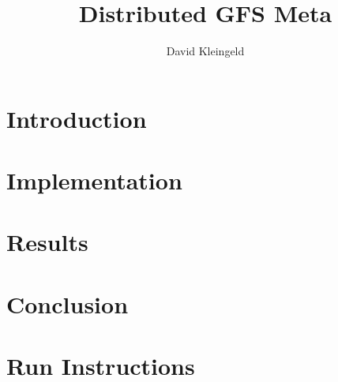 \documentclass[lang=en, hanging-titles=true]{skrapport}
\title{Distributed GFS Meta}
\author[opensource@davidsk.dev]{David Kleingeld}
\begin{document}
\maketitle
\tableofcontents

\section{Introduction} 
\label{sec:intro}

\section{Implementation} 
\label{sec:impl}

\section{Results} 
\label{sec:res}

\section{Conclusion} 
\label{sec:conc}


\clearpage
\appendix
\section{Run Instructions} 
\label{sec:deploy}

\printbibliography
\end{document}
